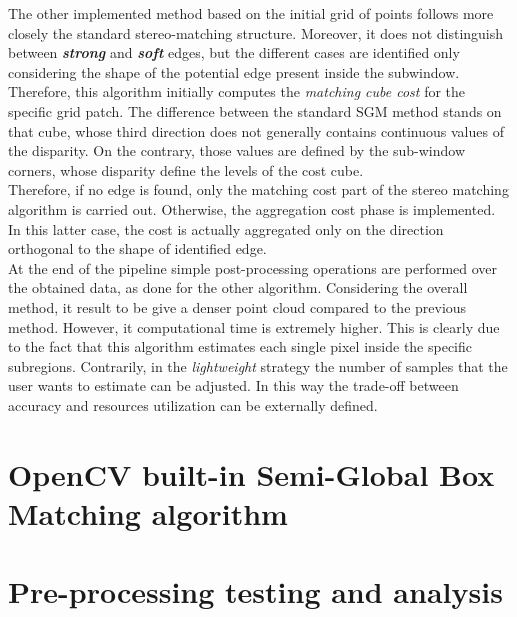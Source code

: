 The other implemented method based on the initial grid of points follows more closely the standard stereo-matching structure.
Moreover, it does not distinguish between \textbf{\textit{strong}} and \textbf{\textit{soft}} edges, but the different cases are identified only considering the shape of the potential edge present inside the subwindow. \\
Therefore, this algorithm initially computes the \textit{matching cube cost} for the specific grid patch. 
The difference between the standard SGM method stands on that cube, whose third direction does not generally contains continuous values of the disparity.
On the contrary, those values are defined by the sub-window corners, whose disparity define the levels of the cost cube.\\
Therefore, if no edge is found, only the matching cost part of the stereo matching algorithm is carried out.
Otherwise, the aggregation cost phase is implemented.
In this latter case, the cost is actually aggregated only on the direction orthogonal to the shape of identified edge.\\
At the end of the pipeline simple post-processing operations are performed over the obtained data, as done for the other algorithm.
Considering the overall method, it result to be give a denser point cloud compared to the previous method. 
However, it computational time is extremely higher.
This is clearly due to the fact that this algorithm estimates each single pixel inside the specific subregions.
Contrarily, in the \textit{lightweight} strategy the number of samples that the user wants to estimate can be adjusted. 
In this way the trade-off between accuracy and resources utilization can be externally defined. 

\section{OpenCV built-in Semi-Global Box Matching algorithm}
\label{section:opencv-sgm-method}

\section{Pre-processing testing and analysis}
\label{section:pre-processing-impl}

